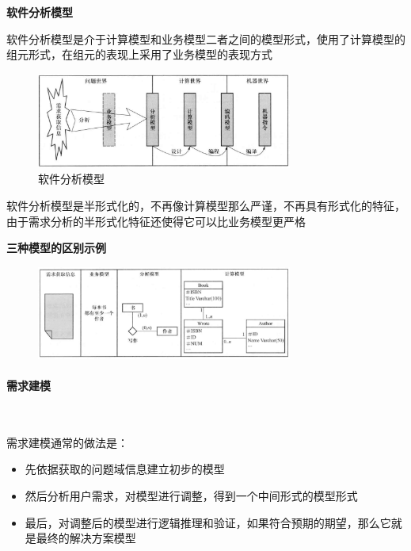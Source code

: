 \textbf{软件分析模型} \par
软件分析模型是介于计算模型和业务模型二者之间的模型形式，使用了计算模型的组元形式，在组元的表现上采用了业务模型的表现方式

\begin{figure}[H]
	\centering
    \vspace{-0.5em}
	\includegraphics[width=0.75\textwidth]{img/软件分析模型.png}
    \caption*{软件分析模型}
    \vspace{-1em}
\end{figure}

软件分析模型是半形式化的，不再像计算模型那么严谨，不再具有形式化的特征，由于需求分析的半形式化特征还使得它可以比业务模型更严格

\textbf{三种模型的区别示例} \par
\begin{figure}[H]
	\centering
    \vspace{-0.5em}
	\includegraphics[width=0.75\textwidth]{img/3种模型的区别示例.png}
    \vspace{-1em}
\end{figure}

\paragraph{需求建模}~{} \par
需求建模通常的做法是：
\begin{itemize}
    \item 先依据获取的问题域信息建立初步的模型
    \item 然后分析用户需求，对模型进行调整，得到一个中间形式的模型形式
    \item 最后，对调整后的模型进行逻辑推理和验证，如果符合预期的期望，那么它就是最终的解决方案模型
\end{itemize}

